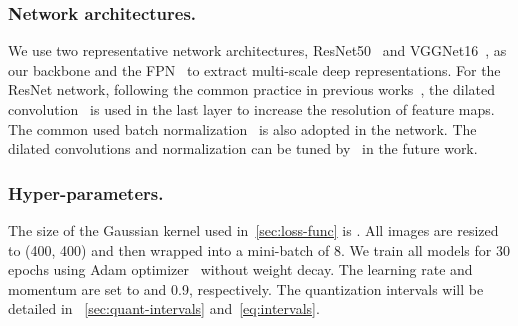 \documentclass[10pt,journal,cspaper,compsoc]{IEEEtran}
\newcommand{\CheckRmv}[1]{}
\newcommand{\CheckRmv}[1]{#1}
\begin{document}
\subsubsection{Network architectures.}
We use two representative network architectures,
ResNet50~\cite{he2016deep} and VGGNet16~\cite{simonyan2014very}, as our backbone
and the FPN~\cite{lin2017feature} to extract multi-scale deep representations.
For the ResNet network, following the common practice in previous works~\cite{zhao2017pyramid,chen2018encoder,pami20Res2net},
the dilated convolution~\cite{yu2015multi} is used in the last layer to increase the resolution of feature maps. The common used batch normalization~\cite{ioffe2015batch} is also adopted in the network. 
The dilated convolutions and normalization can be tuned by~\cite{gao2021rbn,gao2021global2local} in the future work.


\subsubsection{Hyper-parameters.}
The size of the Gaussian kernel used in~\cref{sec:loss-func} is . 
All images are resized to (400, 400) and then wrapped into a mini-batch of 8.
We train all models for 30 epochs using Adam optimizer~\cite{kingma2014adam} without weight decay.
The learning rate and momentum are set to  and 0.9, respectively.
The quantization intervals  will be detailed in
~\cref{sec:quant-intervals} and~\cref{eq:intervals}.


\CheckRmv{
\begin{figure*}[!htb]
  \centering
  \begin{overpic}[width=1\linewidth]{figures/matching.pdf}
    \put(-0.5,10){{\color{BlueGreen}{}}}
    \put(-0.5,8){{\color{BlueGreen}{}}}
    \put(-0.5,6){{\color{BlueGreen}{}}}
    \put(-0.5,4.2){{\color{BlueGreen}{}}}
\put(15.5,11){{\color{orange}{}}}
    \put(15.5,7.2){{\color{orange}{}}}
    \put(15.5,4.5){{\color{orange}{}}}
\put(26,1.5){}
    \put(31.5,1.5){}
    \put(37.8,1.5){}
    \put(22.5,15.2){}
    \put(29,15.2){}
    \put(35,15.2){}
    \put(41.3,15.2){}
\put(54,1.5){}
    \put(61,1.5){}
    \put(67,1.5){}
    \put(51.5,15.2){}
    \put(57.3,15.2){}
    \put(63.3,15.2){}
    \put(70,15.2){}
\put(95.1,1.5){\scriptsize FN}
    \put(79,15.2){\scriptsize TP}
    \put(86,15.2){\scriptsize TP}
    \put(92,15.2){\scriptsize FP}
    \put(98,15.2){\scriptsize FP}
\put(20,8){}
    \put(47,8){}
    \put(75,8){}
\put(8,-1){(a)}
    \put(32,-1){(b)}
    \put(60,-1){(c)}
    \put(87.6,-1){(d)}
  \end{overpic}
  \caption{
    Illustration of the bipartite graph matching in evaluation.
(a) An example image with 3 ground-truth lines ()
    and 4 predictions ().
(b) the corresponding bipartite graph.
The edge between a pair of nodes represents the similarity ( in ~\cref{eq:ea-score}) between lines.
(c) after maximum matching of a bipartite graph, each node in a subgraph
    is connected with no more than 1 node from the other subgraph.
(d) true positive (TP), false positive (FP) and false negative (FN).
  }\vspace{20pt}
  \label{fig:matching}
\end{figure*}
}
\end{document}
